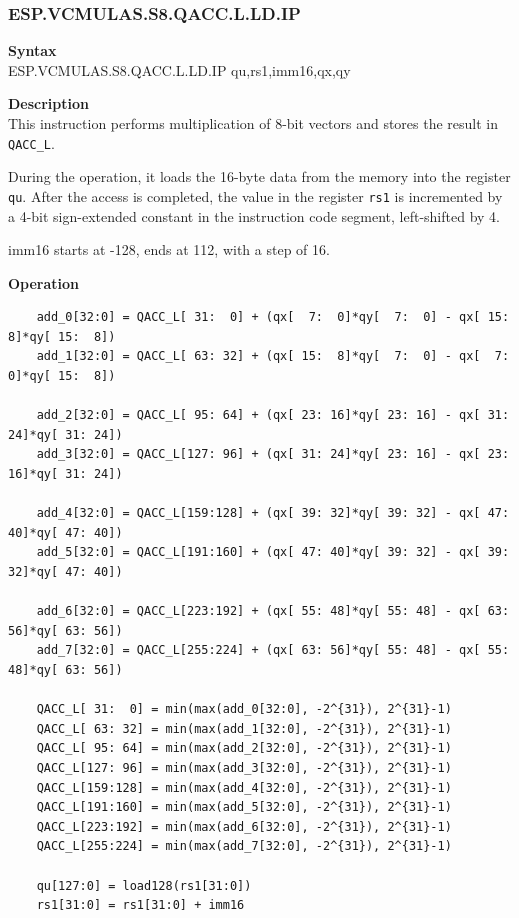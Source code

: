\newpage
\subsubsection{ESP.VCMULAS.S8.QACC.L.LD.IP}\label{instruction:ESPVCMULASS8QACC_LLDIP}
\textbf{Syntax}\\
ESP.VCMULAS.S8.QACC.L.LD.IP qu,rs1,imm16,qx,qy

\textbf{Description}\\
This instruction performs multiplication of 8-bit vectors and stores the result in \lstinline{QACC_L}.

During the operation, it loads the 16-byte data from the memory into the register \lstinline{qu}. After the access is completed, the value in the register \lstinline{rs1} is incremented by a 4-bit sign-extended constant in the instruction code segment, left-shifted by 4.

imm16 starts at -128, ends at 112, with a step of 16.

\textbf{Operation}\\
\begin{lstlisting}
    add_0[32:0] = QACC_L[ 31:  0] + (qx[  7:  0]*qy[  7:  0] - qx[ 15:  8]*qy[ 15:  8])
    add_1[32:0] = QACC_L[ 63: 32] + (qx[ 15:  8]*qy[  7:  0] - qx[  7:  0]*qy[ 15:  8])

    add_2[32:0] = QACC_L[ 95: 64] + (qx[ 23: 16]*qy[ 23: 16] - qx[ 31: 24]*qy[ 31: 24])
    add_3[32:0] = QACC_L[127: 96] + (qx[ 31: 24]*qy[ 23: 16] - qx[ 23: 16]*qy[ 31: 24])

    add_4[32:0] = QACC_L[159:128] + (qx[ 39: 32]*qy[ 39: 32] - qx[ 47: 40]*qy[ 47: 40])
    add_5[32:0] = QACC_L[191:160] + (qx[ 47: 40]*qy[ 39: 32] - qx[ 39: 32]*qy[ 47: 40])

    add_6[32:0] = QACC_L[223:192] + (qx[ 55: 48]*qy[ 55: 48] - qx[ 63: 56]*qy[ 63: 56])
    add_7[32:0] = QACC_L[255:224] + (qx[ 63: 56]*qy[ 55: 48] - qx[ 55: 48]*qy[ 63: 56])

    QACC_L[ 31:  0] = min(max(add_0[32:0], -2^{31}), 2^{31}-1)
    QACC_L[ 63: 32] = min(max(add_1[32:0], -2^{31}), 2^{31}-1)
    QACC_L[ 95: 64] = min(max(add_2[32:0], -2^{31}), 2^{31}-1)
    QACC_L[127: 96] = min(max(add_3[32:0], -2^{31}), 2^{31}-1)
    QACC_L[159:128] = min(max(add_4[32:0], -2^{31}), 2^{31}-1)
    QACC_L[191:160] = min(max(add_5[32:0], -2^{31}), 2^{31}-1)
    QACC_L[223:192] = min(max(add_6[32:0], -2^{31}), 2^{31}-1)
    QACC_L[255:224] = min(max(add_7[32:0], -2^{31}), 2^{31}-1)

    qu[127:0] = load128(rs1[31:0])
    rs1[31:0] = rs1[31:0] + imm16
\end{lstlisting}

